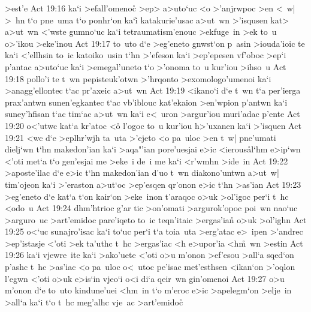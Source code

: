 >est'e\bibvsend
\vs Act 19:16
ka`i
>efall'omenoc\r{}
>ep>
a>uto`uc
<o
>'anjrwpoc
>en
<~w|
>~hn
t`o
pne~uma
t`o
ponhr`on
ka`i\r{}
katakurie'usac
a>ut~wn
>'isqusen
kat>
a>ut~wn
<'wste
gumno`uc
ka`i
tetraumatism'enouc
>ekfuge~in
>ek
to~u
o>'ikou
>eke'inou\bibvsend
\vs Act 19:17
to~uto
d`e
>eg'eneto
gnwst`on
p~asin
>iouda'ioic
te
ka`i
<'ellhsin
to~ic
katoiko~usin
t`hn
>'efeson
ka`i
>ep'epesen
vf'oboc
>ep`i
p'antac
a>uto`uc
ka`i
>emegal'uneto
t`o
>'onoma
to~u
kur'iou
>ihso~u\bibvsend
\vs Act 19:18
pollo'i
te
t~wn
pepisteuk'otwn
>'hrqonto
>exomologo'umenoi
ka`i
>anagg'ellontec
t`ac
pr'axeic
a>ut~wn\bibvsend
\vs Act 19:19
<ikano`i
d`e
t~wn
t`a
per'ierga
prax'antwn
sunen'egkantec
t`ac
vb'iblouc
kat'ekaion
>en'wpion
p'antwn
ka`i
suney'hfisan
t`ac
tim`ac
a>ut~wn
ka`i
e<~uron
>argur'iou
muri'adac
p'ente\bibvsend
\vs Act 19:20
o<'utwc
kat`a
kr'atoc
<o\r{}
l'ogoc
to~u
kur'iou
h>'uxanen
ka`i
>'isquen\bibvsend
\vs Act 19:21
<wc
d`e
>eplhr'wjh
ta~uta
>'ejeto
<o
pa~uloc
>en
t~w|
pne'umati
dielj`wn
t`hn
makedon'ian
ka`i
>aqa"'ian
pore'uesjai
e>ic
<ierous\r{a}l`hm
e>ip`wn
<'oti
met`a
t`o
gen'esjai
me
>eke~i
de~i
me
ka`i
<r'wmhn
>ide~in\bibvsend
\vs Act 19:22
>aposte'ilac
d`e
e>ic
t`hn
makedon'ian
d'uo
t~wn
diakono'untwn
a>ut~w|
tim'ojeon
ka`i
>'eraston
a>ut`oc
>ep'esqen
qr'onon
e>ic
t`hn
>as'ian\bibvsend
\vs Act 19:23
>eg'eneto
d`e
kat`a
t`on
kair`on
>eke~inon
t'araqoc
o>uk
>ol'igoc
per`i
t~hc
<odo~u\bibvsend
\vs Act 19:24
dhm'htrioc
g'ar
tic
>on'omati
>argurok'opoc
poi~wn
nao`uc
>arguro~uc
>art'emidoc
pare'iqeto
to~ic
teqn'itaic
>ergas'ian\r{}
o>uk
>ol'ighn\bibvsend
\vs Act 19:25
o<`uc
sunajro'isac
ka`i
to`uc
per`i
t`a
toia~uta
>erg'atac
e>~ipen
>'andrec
>ep'istasje
<'oti
>ek
ta'uthc
t~hc
>ergas'iac
<h
e>upor'ia
<h\r{m}~wn
>estin\bibvsend
\vs Act 19:26
ka`i
vjewre~ite
ka`i
>ako'uete
<'oti
o>u
m'onon
>ef'esou
>all`a
sqed`on
p'ashc
t~hc
>as'iac
<o
pa~uloc
o<~utoc
pe'isac
met'esthsen
<ikan`on
>'oqlon
l'egwn
<'oti
o>uk
e>is`in
vjeo`i
o<i
di`a
qeir~wn
gin'omenoi\bibvsend
\vs Act 19:27
o>u
m'onon
d`e
to~uto
kindune'uei
<hm~in
t`o
m'eroc
e>ic
>apelegm`on
>elje~in
>all`a
ka`i
t`o
t~hc
meg'alhc
vje~ac
>art'emidoc\r{}
